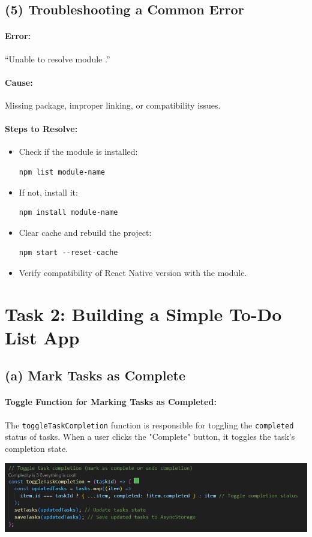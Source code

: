 \documentclass[12pt]{article}
\begin{document}
\subsection*{(5) Troubleshooting a Common Error}
\paragraph{Error:} ``Unable to resolve module .''

\paragraph{Cause:} Missing package, improper linking, or compatibility issues.

\paragraph{Steps to Resolve:}
\begin{itemize}
    \item Check if the module is installed:
    \begin{verbatim}
npm list module-name
    \end{verbatim}
    \item If not, install it:
    \begin{verbatim}
npm install module-name
    \end{verbatim}
    \item Clear cache and rebuild the project:
    \begin{verbatim}
npm start --reset-cache
    \end{verbatim}
    \item Verify compatibility of React Native version with the module.
\end{itemize}

\section*{Task 2: Building a Simple To-Do List App}

\subsection*{(a) Mark Tasks as Complete}

\paragraph{Toggle Function for Marking Tasks as Completed:}
The \texttt{toggleTaskCompletion} function is responsible for toggling the \texttt{completed} status of tasks. When a user clicks the "Complete" button, it toggles the task's completion state.
\begin{center}
\includegraphics[width=1\textwidth]{images/completedtoggle.png} 
\end{center}
\end{document}

